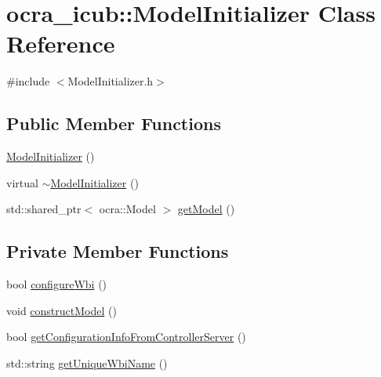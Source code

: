 \hypertarget{classocra__icub_1_1ModelInitializer}{}\section{ocra\+\_\+icub\+:\+:Model\+Initializer Class Reference}
\label{classocra__icub_1_1ModelInitializer}


{\ttfamily \#include $<$Model\+Initializer.\+h$>$}

\subsection*{Public Member Functions}
\begin{DoxyCompactItemize}
\item 
\hyperlink{classocra__icub_1_1ModelInitializer_a14a314ebc05e38e472607b76951d31cc}{Model\+Initializer} ()
\item 
virtual \hyperlink{classocra__icub_1_1ModelInitializer_af72e47a78f20f34f77be2b9e6921ca19}{$\sim$\+Model\+Initializer} ()
\item 
std\+::shared\+\_\+ptr$<$ ocra\+::\+Model $>$ \hyperlink{classocra__icub_1_1ModelInitializer_aa8fbe9e7f20a2b4a29b6fce403c500c8}{get\+Model} ()
\end{DoxyCompactItemize}
\subsection*{Private Member Functions}
\begin{DoxyCompactItemize}
\item 
bool \hyperlink{classocra__icub_1_1ModelInitializer_afa7e888280149483f0ff27ced546801b}{configure\+Wbi} ()
\item 
void \hyperlink{classocra__icub_1_1ModelInitializer_a90747ff9773627f37ca9453491377b2c}{construct\+Model} ()
\item 
bool \hyperlink{classocra__icub_1_1ModelInitializer_abb762b28a1e7b57103f609c4fab4e94e}{get\+Configuration\+Info\+From\+Controller\+Server} ()
\item 
std\+::string \hyperlink{classocra__icub_1_1ModelInitializer_a086ea4822765ab6daff59fae1db0bd11}{get\+Unique\+Wbi\+Name} ()
\end{DoxyCompactItemize}
